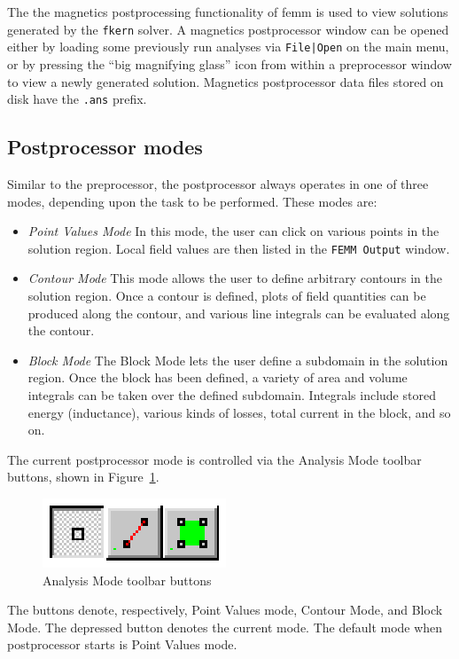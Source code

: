 \documentclass[12pt]{report}
\begin{document}
The the magnetics postprocessing functionality of femm is used to
view solutions generated by the {\tt fkern} solver.  A magnetics
postprocessor window can be opened either by loading some
previously run analyses via {\tt File|Open} on the main menu, or by
pressing the ``big magnifying glass'' icon from within a
preprocessor window to view a newly generated solution. Magnetics
postprocessor data files stored on disk have the {\tt .ans} prefix.

\subsection{Postprocessor modes} \label{tape}

Similar to the preprocessor, the postprocessor always operates in
one of three modes, depending upon the task to be performed.  These
modes are:
\begin{itemize}
\item {\em Point Values Mode} In this mode, the user can click on
various points in the solution region.  Local field values are then
listed in the {\tt FEMM Output} window.
\item {\em Contour Mode} This mode allows the user to define
arbitrary contours in the solution region.  Once a contour is
defined, plots of field quantities can be produced along the
contour, and various line integrals can be evaluated along the
contour.
\item {\em Block Mode} The Block Mode lets the user define a
subdomain in the solution region.  Once the block has been defined,
a variety of area and volume integrals can be taken over the
defined subdomain.  Integrals include stored energy (inductance),
various kinds of losses, total current in the block, and so on.
\end{itemize}

The current postprocessor mode is controlled via the Analysis Mode
toolbar buttons, shown in Figure~\ref{anal_mode}.
\begin{figure}[ht]
\centerline{\includegraphics{analmode.ps}}
\caption{Analysis Mode toolbar buttons}
\label{anal_mode}
\end{figure}
The buttons denote, respectively, Point Values mode, Contour Mode,
and Block Mode.  The depressed button denotes the current mode. The
default mode when postprocessor starts is Point Values mode.
\end{document}
